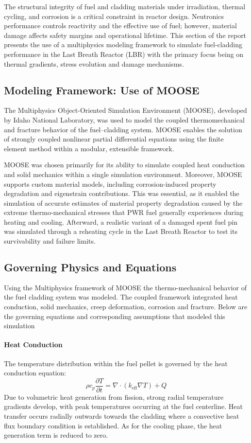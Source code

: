 The structural integrity of fuel and cladding materials under irradiation, thermal cycling, and corrosion is a critical constraint in reactor design. Neutronics performance controls reactivity and the effective use of fuel; however, material damage affects safety margins and operational lifetime. This section of the report presents the use of a multiphysics modeling framework to simulate fuel-cladding performance in the Last Breath Reactor (LBR) with the primary focus being on thermal gradients, stress evolution and damage mechanisms.

\subsection{Modeling Framework: Use of MOOSE}
The Multiphysics Object-Oriented Simulation Environment (MOOSE), developed by Idaho National Laboratory, was used to model the coupled thermomechanical and fracture behavior of the fuel–cladding system. MOOSE enables the solution of strongly coupled nonlinear partial differential equations using the finite element method within a modular, extensible framework.

MOOSE was chosen primarily for its ability to simulate coupled heat conduction and solid mechanics within a single simulation environment. Moreover, MOOSE supports custom material models, including corrosion-induced property degradation and eigenstrain contributions. This was essential, as it enabled the simulation of accurate estimates of material property degradation caused by the extreme thermo-mechanical stresses that PWR fuel generally experiences during heating and cooling. Afterward, a realistic variant of a damaged spent fuel pin was simulated through a reheating cycle in the Last Breath Reactor to test its survivability and failure limits.


\subsection{Governing Physics and Equations}
Using the Multiphysics framework of MOOSE the thermo-mechanical behavior of the fuel cladding system was modeled. The coupled framework integrated heat conduction, solid mechanics, creep deformation, corrosion and fracture. Below are the governing equations and corresponding assumptions that modeled this simulation

\paragraph{Heat Conduction}
The temperature distribution within the fuel pellet is governed by the heat conduction equation:
\begin{equation}
    \rho c_p\frac{\partial T}{\partial t}=\nabla\cdot\left(k_{\mathrm{eff}}\nabla T\right)+Q
\end{equation}
Due to volumetric heat generation from fission, strong radial temperature gradients develop, with peak temperatures occurring at the fuel centerline. Heat transfer occurs radially outwards towards the cladding where a convective heat flux boundary condition is established. As for the cooling phase, the heat generation term is reduced to zero.

